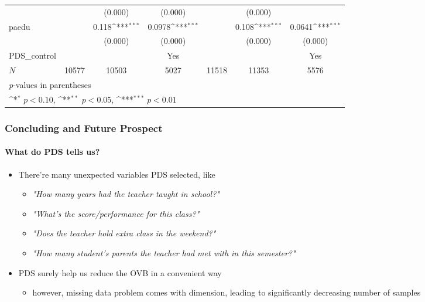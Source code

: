 \documentclass{beamer}
\def\sym#1{\ifmmode^{#1}\else\(^{#1}\)\fi}
\begin{document}
\begin{frame}[shrink=38]
\begin{tabular}{l*{6}c}
                &                     &     (0.000)         &     (0.000)         &                     &     (0.000)         &                     \\
    [1em]
    paedu       &                     &       0.118\sym{***}&      0.0978\sym{***}&                     &       0.108\sym{***}&      0.0641\sym{***}\\
                &                     &     (0.000)         &     (0.000)         &                     &     (0.000)         &     (0.000)         \\
    [1em]
    PDS\_control  &                     &                    &      Yes             &                   &                 &      Yes \\
    \hline
    \(N\)       &       10577         &       10503         &        5027         &       11518         &       11353         &        5576         \\
    \bottomrule
    \multicolumn{7}{l}{\footnotesize \textit{p}-values in parentheses} \\
    \multicolumn{7}{l}{\footnotesize \sym{*} \(p<0.10\), \sym{**} \(p<0.05\), \sym{***} \(p<0.01\)} \\
\end{tabular}

\end{frame}


\begin{frame} %
\frametitle{Concluding and Future Prospect}
\framesubtitle{What do PDS tells us?}

    \begin{itemize}
        \item There're many unexpected variables PDS selected, like
        \begin{itemize}
        \item \textsl{"How many years had the teacher taught in school?"}
        \item \textit{"What's the score/performance for this class?"}
        \item \textit{"Does the teacher hold extra class in the weekend?"}
        \item \textit{"How many student's parents the teacher had met with in this semester?"}
        \end{itemize}
        \item PDS surely help us reduce the OVB in a convenient way
        \begin{itemize}
            \item however, missing data problem comes with dimension, leading to significantly decreasing number of samples
        \end{itemize}
    \end{itemize}

\end{frame}
    
\end{document}
